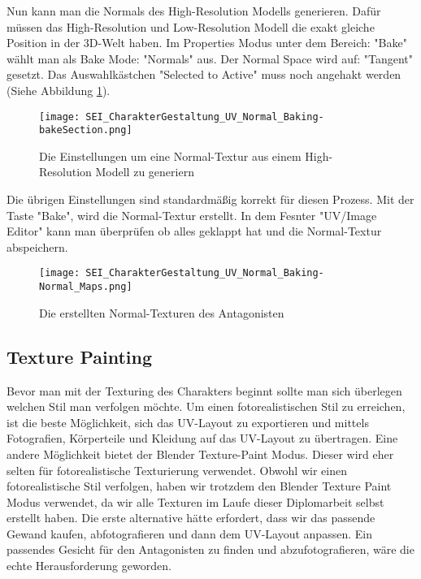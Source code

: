Nun kann man die Normals des High-Resolution Modells generieren. Dafür müssen das High-Resolution und Low-Resolution
Modell die exakt gleiche Position in der 3D-Welt haben. Im Properties Modus unter dem Bereich: "Bake" wählt man als
Bake Mode: "Normals" aus. Der Normal Space wird auf: "Tangent" gesetzt. Das Auswahlkästchen "Selected to Active" muss
noch angehakt werden (Siehe Abbildung \ref{picture:baking_settings}).

\begin{figure}[H]
    \centering
    \texttt{[image: SEI\_CharakterGestaltung\_UV\_Normal\_Baking-bakeSection.png]}
    \caption{Die Einstellungen um eine Normal-Textur aus einem High-Resolution Modell zu generiern}
    \label{picture:baking_settings}
\end{figure}


Die übrigen Einstellungen sind standardmäßig korrekt für diesen Prozess. Mit der Taste "Bake",
wird die Normal-Textur erstellt. In dem Fesnter "UV/Image Editor" kann man überprüfen ob alles geklappt hat und die
Normal-Textur abspeichern.

\begin{figure}[H]
    \centering
    \texttt{[image: SEI\_CharakterGestaltung\_UV\_Normal\_Baking-Normal\_Maps.png]}
    \caption{Die erstellten Normal-Texturen des Antagonisten}
    \label{picture:antagonist_normals}
\end{figure}




\subsection{Texture Painting}
\label{sec:texture_painting}

Bevor man mit der Texturing des Charakters beginnt sollte man sich überlegen welchen Stil man verfolgen möchte. Um
einen fotorealistischen Stil zu erreichen, ist die beste Möglichkeit, sich das UV-Layout zu exportieren und mittels
Fotografien, Körperteile und Kleidung auf das UV-Layout zu übertragen.
Eine andere Möglichkeit bietet der Blender Texture-Paint Modus\citep{blender:tex_painting}. Dieser wird eher selten
für fotorealistische Texturierung verwendet. Obwohl wir einen fotorealistische Stil verfolgen, haben wir trotzdem
den Blender Texture Paint Modus verwendet, da wir alle Texturen im Laufe dieser Diplomarbeit selbst erstellt haben.
Die erste alternative hätte erfordert, dass wir das passende Gewand kaufen, abfotografieren und dann dem UV-Layout
anpassen. Ein passendes Gesicht für den Antagonisten zu finden und abzufotografieren, wäre die echte Herausforderung
geworden.

